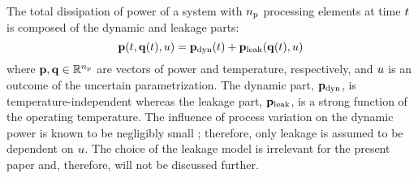 The total dissipation of power of a system with ${n_\text{p}}$ processing elements at time $t$ is composed of the dynamic and leakage parts:
\begin{equation} \elabel{total-power}
  \vP(\t, \vT(\t), \u) = \vP_\dyn(\t) + \vP_\leak(\vT(\t), \u)
\end{equation}
where $\mathbf{p}, \mathbf{q} \in \mathbb{R}^{n_\text{p}}$ are vectors of power and temperature, respectively, and $u$ is an outcome of the uncertain parametrization. The dynamic part, $\mathbf{p}_{\text{dyn}}$, is temperature-independent whereas the leakage part, $\mathbf{p}_{\text{leak}}$, is a strong function of the operating temperature.
The influence of process variation on the dynamic power is known to be negligibly small \cite{srivastava2010, juan2011, juan2012}; therefore, only leakage is assumed to be dependent on $u$.
The choice of the leakage model is irrelevant for the present paper and, therefore, will not be discussed further.
